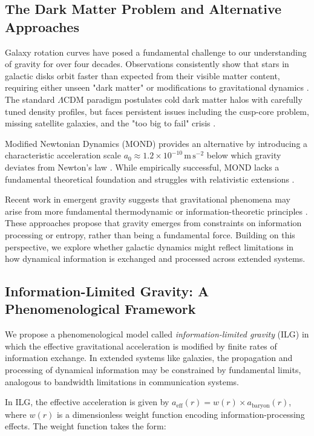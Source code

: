 \documentclass[fleqn,usenatbib]{mnras}
\begin{document}
\subsection{The Dark Matter Problem and Alternative Approaches}

Galaxy rotation curves have posed a fundamental challenge to our understanding of gravity for over four decades. Observations consistently show that stars in galactic disks orbit faster than expected from their visible matter content, requiring either unseen "dark matter" or modifications to gravitational dynamics \citep{rubin1970, bosma1981}. The standard $\Lambda$CDM paradigm postulates cold dark matter halos with carefully tuned density profiles, but faces persistent issues including the cusp-core problem, missing satellite galaxies, and the "too big to fail" crisis \citep{bullock2017, boylan2013}.

Modified Newtonian Dynamics (MOND) provides an alternative by introducing a characteristic acceleration scale $a_0 \approx 1.2 \times 10^{-10}\,\mathrm{m\,s^{-2}}$ below which gravity deviates from Newton's law \citep{milgrom1983}. While empirically successful, MOND lacks a fundamental theoretical foundation and struggles with relativistic extensions \citep{famaey2012}.

Recent work in emergent gravity suggests that gravitational phenomena may arise from more fundamental thermodynamic or information-theoretic principles \citep{verlinde2011, verlinde2017}. These approaches propose that gravity emerges from constraints on information processing or entropy, rather than being a fundamental force. Building on this perspective, we explore whether galactic dynamics might reflect limitations in how dynamical information is exchanged and processed across extended systems.

\subsection{Information-Limited Gravity: A Phenomenological Framework}

We propose a phenomenological model called \emph{information-limited gravity} (ILG) in which the effective gravitational acceleration is modified by finite rates of information exchange. In extended systems like galaxies, the propagation and processing of dynamical information may be constrained by fundamental limits, analogous to bandwidth limitations in communication systems.

In ILG, the effective acceleration is given by $a_\mathrm{eff}(r) = w(r) \times a_\mathrm{baryon}(r)$, where $w(r)$ is a dimensionless weight function encoding information-processing effects. The weight function takes the form:
\end{document}
